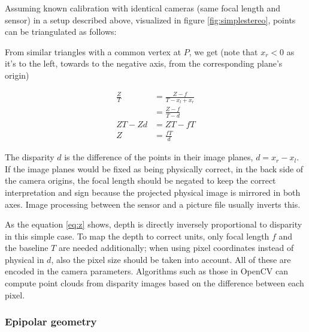 Assuming known calibration with identical cameras (same focal length and sensor) in a setup described above, visualized in figure \ref{fig:simplestereo}, points can be triangulated as follows:

From similar triangles with a common vertex at $P$, we get (note that $x_r < 0$ as it's to the left, towards to the negative axis, from the corresponding plane's origin)

\begin{align}
	\frac{Z}{T} &= \frac{Z-f}{T - x_l + x_r} \\
	&= \frac{Z-f}{T - d}\\
	ZT - Zd &= ZT - fT\\
	Z &= \frac{fT}{d} \label{eq:z}
\end{align}

The disparity $d$ is the difference of the points in their image planes, $d = x_r - x_l$.
If the image planes would be fixed as being physically correct, in the back side of the camera origins, the focal length should be negated to keep the correct interpretation and sign because the projected physical image is mirrored in both axes. Image processing between the sensor and a picture file usually inverts this.

As the equation \ref{eq:z} shows, depth is directly inversely proportional to disparity in this simple case.
To map the depth to correct units, only focal length $f$ and the baseline $T$ are needed additionally; when using pixel coordinates instead of physical in $d$, also the pixel size should be taken into account.
All of these are encoded in the camera parameters.
Algorithms such as those in OpenCV \cite{opencv} can compute point clouds from disparity images based on the difference between each pixel.


\subsubsection{Epipolar geometry} %

